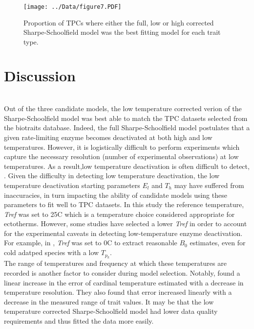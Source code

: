 \documentclass[11pt]{article}
\begin{document}
\begin{figure}[H]
      \texttt{[image: ../Data/figure7.PDF]}
      \centering
      \caption{Proportion of TPCs where either the full, low or high corrected Sharpe-Schoolfield model was the best fitting model for each trait type.}
\end{figure}


\section*{Discussion}\\
\noindent
Out of the three candidate models, the low temperature corrected verion of the Sharpe-Schoolfield model was best able to match the TPC datasets selected from the biotraits database. Indeed, the full Sharpe-Schoolfield model postulates that a given rate-limiting enzyme becomes deactivated at both high and low temperatures. However, it is logistically difficult to perform experiments which capture the necessary resolution (number of experimental observations) at low temperatures. As a result,low temperature deactivation is often difficult to detect,  \cite{Pawar2016}. Given the difficulty in detecting low temperature deactivation, the low temperature deactivation starting parameters ${E_l}$ and ${T_h}$ may have suffered from inaccuracies, in turn impacting the ability of candidate models using these parameters to fit well to TPC datasets. In this study the reference temperature, \textit{Tref} was set to 25\textdegree{}C which is a temperature choice considered appropriate for ectotherms. However, some studies have selected a lower \textit{Tref} in order to account for the experimental caveats in detecting low-temperature enzyme deactivation. For example, in  \cite{Sal2018}, \textit{Tref} was set to 0\textdegree{}C to extract reasonable ${B_0}$ estimates, even for cold adatped species with a low ${T_p_k}$.\\

\noindent
The range of temperatures and frequency at which these temperatures are recorded is another factor to consider during model selection. Notably, \cite{Low-Decarie2017a} found a linear increase in the error of cardinal temperature estimated with a decrease in temperature resolution. They also found that error increased linearly with a decrease in the measured range of trait values. It may be that the low temperature corrected Sharpe-Schoolfield model had lower data quality requirements and thus fitted the data more easily.\\
\end{document}
